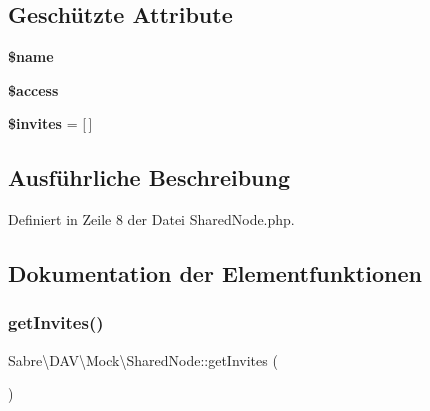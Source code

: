 \subsection*{Geschützte Attribute}
\begin{DoxyCompactItemize}
\item 
\mbox{\label{class_sabre_1_1_d_a_v_1_1_mock_1_1_shared_node_a0ba87d5b91bda5abfc7e16011c6fd5cb}} 
{\bfseries \$name}
\item 
\mbox{\label{class_sabre_1_1_d_a_v_1_1_mock_1_1_shared_node_a9d7e7d6a90850b80d8fde614a16301a5}} 
{\bfseries \$access}
\item 
\mbox{\label{class_sabre_1_1_d_a_v_1_1_mock_1_1_shared_node_af0216b512d0ded2c6f1994a5ed024242}} 
{\bfseries \$invites} = \mbox{[}$\,$\mbox{]}
\end{DoxyCompactItemize}


\subsection{Ausführliche Beschreibung}


Definiert in Zeile 8 der Datei Shared\+Node.\+php.



\subsection{Dokumentation der Elementfunktionen}
\mbox{\label{class_sabre_1_1_d_a_v_1_1_mock_1_1_shared_node_a6deaecb18be485adbdc98b0132b4ab1e}} 
\subsubsection{\texorpdfstring{get\+Invites()}{getInvites()}}
{\footnotesize\ttfamily Sabre\textbackslash{}\+D\+A\+V\textbackslash{}\+Mock\textbackslash{}\+Shared\+Node\+::get\+Invites (\begin{DoxyParamCaption}{ }\end{DoxyParamCaption})}

